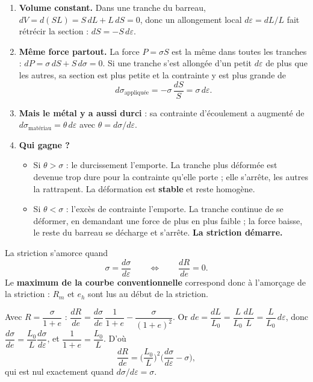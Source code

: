 \begin{enumerate}
  \item \textbf{Volume constant.} Dans une tranche du barreau,
        $dV = d(SL) = S\,dL + L\,dS = 0$, donc un allongement local $d\varepsilon = dL/L$ fait
        rétrécir la section : $dS = -S\,d\varepsilon$.
  \item \textbf{Même force partout.} La force $P = \sigma S$ est la même dans toutes les
        tranches : $dP = \sigma\,dS + S\,d\sigma = 0$. Si une tranche s'est allongée d'un petit
        $d\varepsilon$ de plus que les autres, sa section est plus petite et la contrainte y
        est plus grande de
        \[ d\sigma_{\text{appliquée}} = -\sigma\,\frac{dS}{S} = \sigma\,d\varepsilon . \]
  \item \textbf{Mais le métal y a aussi durci} : sa contrainte d'écoulement a augmenté de
        $d\sigma_{\text{matériau}} = \theta\,d\varepsilon$ avec $\theta = d\sigma/d\varepsilon$.
  \item \textbf{Qui gagne ?}
  \begin{itemize}
    \item Si $\theta > \sigma$ : le durcissement l'emporte. La tranche plus déformée est
          devenue trop dure pour la contrainte qu'elle porte ; elle s'arrête, les autres la
          rattrapent. La déformation est \textbf{stable} et reste homogène.
    \item Si $\theta < \sigma$ : l'excès de contrainte l'emporte. La tranche continue de se
          déformer, en demandant une force de plus en plus faible ; la force baisse, le reste
          du barreau se décharge et s'arrête. \textbf{La striction démarre.}
  \end{itemize}
\end{enumerate}

\begin{thmbox}[title={Critère de Considère (à connaître par c\oe ur)}]
La striction s'amorce quand
\[ \sigma = \frac{d\sigma}{d\varepsilon}
   \qquad\Longleftrightarrow\qquad \frac{dR}{de} = 0 . \]
Le \textbf{maximum de la courbe conventionnelle} correspond donc à l'amorçage de la
striction : $R_m$ et $e_h$ sont lus au début de la striction.
\end{thmbox}

\begin{proofbox}[title={Pourquoi $dR/de = 0$ (démonstration manuscrite du cours)}]
Avec $R = \dfrac{\sigma}{1+e}$ :
$\dfrac{dR}{de} = \dfrac{d\sigma}{de}\,\dfrac{1}{1+e} - \dfrac{\sigma}{(1+e)^2}$.
Or $de = \dfrac{dL}{L_0} = \dfrac{L}{L_0}\dfrac{dL}{L} = \dfrac{L}{L_0}\,d\varepsilon$, donc
$\dfrac{d\sigma}{de} = \dfrac{L_0}{L}\dfrac{d\sigma}{d\varepsilon}$, et
$\dfrac{1}{1+e} = \dfrac{L_0}{L}$. D'où
\[ \frac{dR}{de} = \Big(\frac{L_0}{L}\Big)^2 \Big(\frac{d\sigma}{d\varepsilon} - \sigma\Big),
   \]
qui est nul exactement quand $d\sigma/d\varepsilon = \sigma$.
\end{proofbox}


